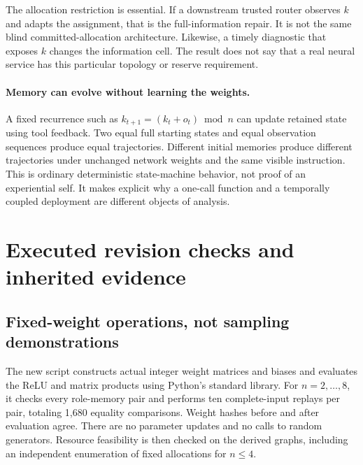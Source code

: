The allocation restriction is essential. If a downstream trusted router observes $k$ and adapts the assignment, that is the full-information repair. It is not the same blind committed-allocation architecture. Likewise, a timely diagnostic that exposes $k$ changes the information cell. The result does not say that a real neural service has this particular topology or reserve requirement.

\paragraph{Memory can evolve without learning the weights.}
A fixed recurrence such as $k_{t+1}=(k_t+o_t)\bmod n$ can update retained state using tool feedback. Two equal full starting states and equal observation sequences produce equal trajectories. Different initial memories produce different trajectories under unchanged network weights and the same visible instruction. This is ordinary deterministic state-machine behavior, not proof of an experiential self. It makes explicit why a one-call function and a temporally coupled deployment are different objects of analysis.

\section{Executed revision checks and inherited evidence}
\label{sec:evaluation}
\subsection{Fixed-weight operations, not sampling demonstrations}
The new script constructs actual integer weight matrices and biases and evaluates the ReLU and matrix products using Python's standard library. For $n=2,\ldots,8$, it checks every role-memory pair and performs ten complete-input replays per pair, totaling 1,680 equality comparisons. Weight hashes before and after evaluation agree. There are no parameter updates and no calls to random generators. Resource feasibility is then checked on the derived graphs, including an independent enumeration of fixed allocations for $n\leq4$.

